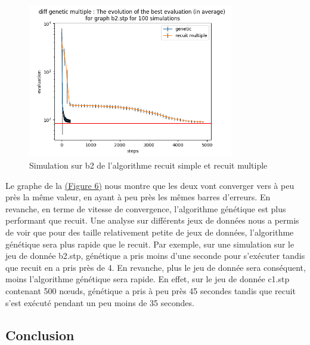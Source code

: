 \documentclass[11pt,french]{report}
\begin{document}
        \begin{figure}
          \begin{center}
            \includegraphics[width=0.8\textwidth]{best_b2_evaluation_diff genetic multiple.png}
          \end{center}
          \caption{Simulation sur b2 de l'algorithme recuit simple et recuit multiple}
          \label{Figure6}
        \end{figure}

        Le graphe de la \hyperref[Figure6]{(Figure 6)} nous montre que les deux vont converger vers à peu près la même valeur, en ayant à peu près les mêmes barres d'erreurs. En revanche, en terme de vitesse de convergence, l'algorithme génétique est plus performant que recuit.
        Une analyse sur différents jeux de données nous a permis de voir que pour des taille relativement petite de jeux de données, l'algorithme génétique sera plus rapide que le recuit. Par exemple, sur une simulation sur le jeu de donnée b2.stp, génétique a pris moins d'une seconde pour s'exécuter tandis que recuit en a pris près de 4.
        En revanche, plus le jeu de donnée sera conséquent, moins l'algorithme génétique sera rapide. En effet, sur le jeu de donnée c1.stp contenant 500 nœuds, génétique a pris à peu près 45 secondes tandis que recuit s'est exécuté pendant un peu moins de 35 secondes.


        \subsection{Conclusion}
\end{document}
